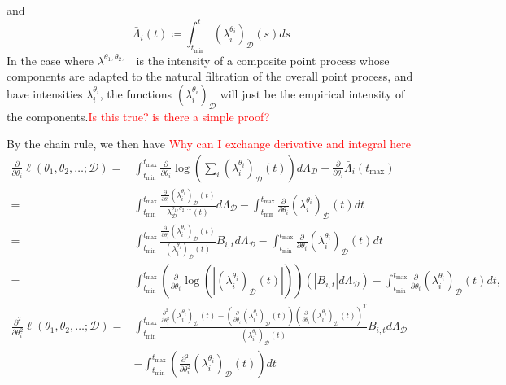 \documentclass[honours,12pt]{unswthesis}
\numberwithin{equation}{section}
\begin{document}
and
$$\bar\Lambda_i(t) \coloneq \int_{t_\mathrm{min}}^t \left(\lambda_i^{\theta_i}\right)_\mathcal{D}(s)ds$$
In the case where $\lambda^{\theta_1,\theta_2,\ldots}$ is the intensity of a composite point process whose components are adapted to the natural filtration of the overall point process, and have intensities $\lambda_i^{\theta_i}$, the functions $\left(\lambda_i^{\theta_i}\right)_\mathcal{D}$ will just be the empirical intensity of the components.\textcolor{red}{Is this true? is there a simple proof?}

By the chain rule, we then have
\textcolor{red}{Why can I exchange derivative and integral here}
\begin{equation*}
	\begin{align}
		\frac{\partial}{\partial \theta_i}\ell(\theta_1,\theta_2,\ldots;\mathcal{D})
		= & \int_{t_\mathrm{min}}^{t_\mathrm{max}}\frac{\partial}{\partial\theta_i}\log\left(\sum_i \left(\lambda_i^{\theta_i}\right)_\mathcal{D}(t)\right)d\Lambda_\mathcal{D} - \frac{\partial}{\partial\theta_i}\bar\Lambda_i(t_\mathrm{max})\\
		= & \int_{t_\mathrm{min}}^{t_\mathrm{max}}\frac{\frac{\partial}{\partial\theta_i}\left(\lambda_i^{\theta_i}\right)_\mathcal{D}(t)}{\lambda^{\theta_1,\theta_2,\ldots}_\mathcal{D}(t)}d\Lambda_\mathcal{D} - \int_{t_\mathrm{min}}^{t_\mathrm{max}}\frac{\partial}{\partial\theta_i}\left(\lambda_i^{\theta_i}\right)_\mathcal{D}(t)dt\\
		= & \int_{t_\mathrm{min}}^{t_\mathrm{max}}\frac{\frac{\partial}{\partial\theta_i}\left(\lambda_i^{\theta_i}\right)_\mathcal{D}(t)}{\left(\lambda_i^{\theta_i}\right)_\mathcal{D}(t)}B_{i,t}d\Lambda_\mathcal{D} - \int_{t_\mathrm{min}}^{t_\mathrm{max}}\frac{\partial}{\partial\theta_i}\left(\lambda_i^{\theta_i}\right)_\mathcal{D}(t)dt\\
		= & \int_{t_\mathrm{min}}^{t_\mathrm{max}} \left(\frac{\partial}{\partial\theta_i}\log\left(\left\vert\left(\lambda_i^{\theta_i}\right)_\mathcal{D}(t)\right\vert\right)\right) \left(\left\vert B_{i,t}\right\vert d\Lambda_\mathcal{D}\right) - \int_{t_\mathrm{min}}^{t_\mathrm{max}}\frac{\partial}{\partial\theta_i}\left(\lambda_i^{\theta_i}\right)_\mathcal{D}(t)dt,\\
		\frac{\partial^2}{\partial \theta_i^2}\ell(\theta_1,\theta_2,\ldots;\mathcal{D})
		= & \int_{t_\mathrm{min}}^{t_\mathrm{max}} \frac{\frac{\partial^2}{\partial\theta_i^2}\left(\lambda_i^{\theta_i}\right)_\mathcal{D}(t) - \left(\frac{\partial}{\partial\theta_i}\left(\lambda_i^{\theta_i}\right)_\mathcal{D}(t)\right) \left(\frac{\partial}{\partial\theta_i}\left(\lambda_i^{\theta_i}\right)_\mathcal{D}(t)\right)^T }{\left(\lambda_i^{\theta_i}\right)_\mathcal{D}(t)} B_{i,t} d\Lambda_\mathcal{D} \\
		  & - \int_{t_\mathrm{min}}^{t_\mathrm{max}} \left(\frac{\partial^2}{\partial\theta_i^2}\left(\lambda_i^{\theta_i}\right)_\mathcal{D}(t)\right) dt\\
	\end{align}
\end{equation*}
\end{document}
